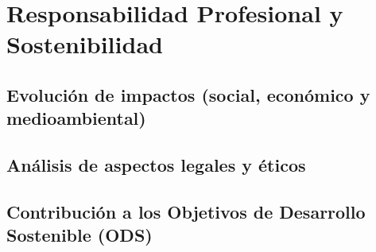 \chapter{Responsabilidad Profesional y Sostenibilidad}
\section{Evolución de impactos (social, económico y medioambiental)}

\section{Análisis de aspectos legales y éticos}

\section{Contribución a los Objetivos de Desarrollo Sostenible (ODS)}